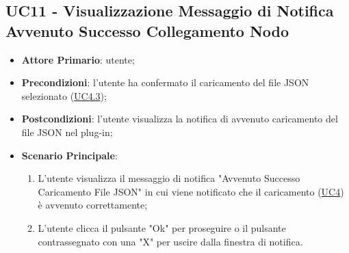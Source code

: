 	
	\label{par:UC11}
	\subsection{UC11 - Visualizzazione Messaggio di Notifica Avvenuto Successo Collegamento Nodo}
		\begin{itemize}
			\item\textbf{Attore Primario}: utente;
			\item\textbf{Precondizioni}: l’utente ha confermato il caricamento del file JSON selezionato  (\hyperref[par:UC4.3]{UC4.3});
			\item\textbf{Postcondizioni}: l’utente visualizza la notifica di avvenuto caricamento del file JSON nel plug-in; 
			\item\textbf{Scenario Principale}: 
				\begin{enumerate} 
					\item L’utente visualizza il messaggio di notifica "Avvenuto Successo Caricamento File JSON" in cui viene notificato che il caricamento (\hyperref[par:UC4]{UC4}) è avvenuto correttamente;
					\item L'utente clicca il pulsante "Ok" per proseguire o il pulsante contrassegnato con una "X" per uscire dalla finestra di notifica.		
				\end{enumerate}		
		\end{itemize}
	
	

	\label{par:UC12}
